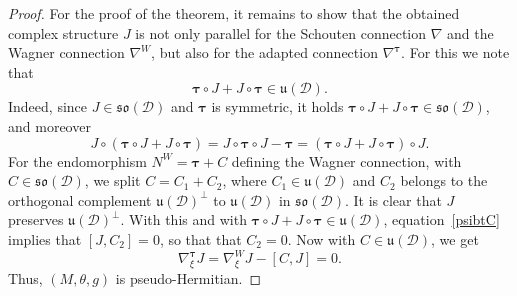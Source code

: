 \documentclass{amsart}
\theoremstyle{plain}
\newtheorem{theorem}{Theorem}[section]
\theoremstyle{definition}
\def\so{\mathfrak{so}}
\def\su{\mathfrak{su}}
\def\u{\mathfrak{u}}
\newcommand{\hol}{\mathfrak{hol}}
\newcommand{\bt}{{\boldsymbol{\tau}}}
\newcommand{\1}{\mathbf{1}}
\newcommand{\D}{{\mathcal D}}
\renewcommand{\d}{\mathrm{d}}
\newcommand{\+}{\oplus}
\newcommand{\tcom}[1]{
 \marginpar{{\scriptsize  T: #1 }}}
\begin{document}
\begin{proof}
For the proof of the theorem, it remains to show that the obtained complex structure $J$ is not only parallel for the Schouten connection $\nabla$ and the Wagner connection $\nabla^W$, but also for the adapted connection $\nabla^\bt$. 
%
%
%
For this we note that  $$\bt\circ J+J\circ\bt\in\u(\D).$$
Indeed, since $J\in\so(\D)$ and $\bt$ is symmetric, it holds  $\bt\circ J+J\circ\bt\in\so(\D)$, and moreover$$J\circ(\bt\circ J+J\circ\bt)=
J\circ\bt\circ J-\bt=(\bt\circ J+J\circ\bt)\circ J.$$ 
For the endomorphism $N^W=\bt+C$ defining the Wagner connection, with $C\in \so(\D)$, we split  $C=C_1+C_2$, where $C_1\in\u(\D)$ and $C_2$ belongs to the orthogonal complement  $\u(\D)^\bot$ to $\u(\D)$ in $\so(\D)$. 
It is clear that $J$ preserves $\u(\D)^\bot$. With this  and with $\bt\circ J+J\circ\bt\in\u(\D)$, equation~\eqref{psibtC} implies that $[J,C_2]=0$, so that that $C_2=0$. Now with $C\in\u(\D)$, we get $$\nabla^\bt_\xi J=\nabla^W_\xi J-[C,J]=0.$$ Thus, $(M,\theta,g)$ is pseudo-Hermitian.
\end{proof}


\end{document}
